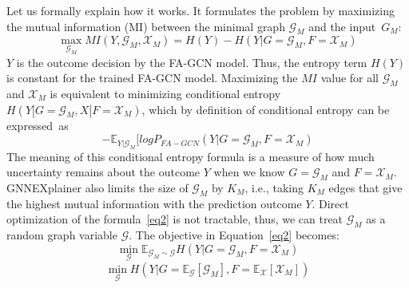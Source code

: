 Let us formally explain how it works. It
formulates the problem by maximizing the mutual information (MI)
between the minimal graph $\mathcal{G}_M$ and the input~$G_M$:
\begin{equation}\label{maineq}
\max_{\mathcal{G}_M} MI(Y,\mathcal{G}_M, \mathcal{X}_M) = H(Y) - H(Y|G=\mathcal{G}_M, F=\mathcal{X}_M)
\end{equation}
$Y$ is the outcome decision by the FA-GCN model. Thus, the entropy term
$H(Y)$ is constant for the trained FA-GCN model. Maximizing the $MI$
value for all $\mathcal{G}_M$ and $\mathcal{X}_M$ is equivalent to minimizing conditional
entropy $H(Y|G=\mathcal{G}_M, X|F=\mathcal{X}_M)$, which by definition of
conditional entropy can be expressed~as
\begin{equation}
  \label{eq2}
-\mathbb{E}_{Y|\mathcal{G}_M}
  [log P_{FA-GCN} (Y|G=\mathcal{G}_M,F=\mathcal{X}_M)
  \end{equation}
The meaning of this conditional entropy formula is a measure of how
much uncertainty remains about the outcome $Y$ when we know
$G=\mathcal{G}_M$ and $F=\mathcal{X}_M$. GNNEXplainer also limits the
size of $\mathcal{G}_M$ by $K_M$, i.e., taking $K_M$ edges that give
the highest mutual information with the prediction outcome $Y$.
%
Direct optimization of the formula~\ref{eq2} is not tractable, thus,
we can treat $\mathcal{G}_M$ as a random graph variable
$\mathcal{G}$. The objective in Equation~\ref{eq2} becomes:
\begin{equation}
  \label{eq3}
  \min_{\mathcal{G}} \mathbb{E}_{\mathcal{G}_M \sim \mathcal{G}} H(Y|G=\mathcal{G}_M,F=\mathcal{X}_M)
\end{equation}
\begin{equation}
  \label{eq4}
  \min_{\mathcal{G}} H(Y| G=\mathbb{E}_{\mathcal{G}}[\mathcal{G}_M], F = \mathbb{E}_{\mathcal{X}}[\mathcal{X}_M])
\end{equation}

